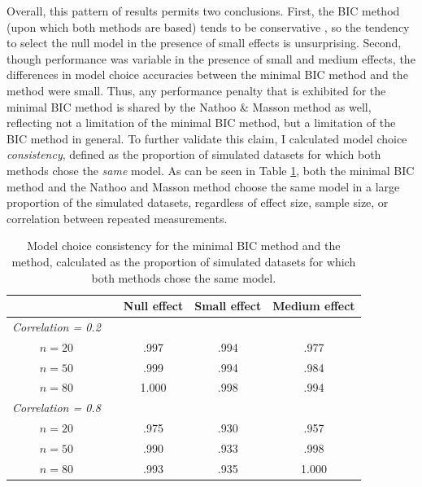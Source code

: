 \documentclass[12pt,twoside,a4paper]{article}
\begin{document}
Overall, this pattern of results permits two conclusions. First, the BIC method (upon which both methods are based) tends to be conservative \citep{wagenmakers2007}, so the tendency to select the null model in the presence of small effects is unsurprising. Second, though performance was variable in the presence of small and medium effects, the differences in model choice accuracies between the minimal BIC method and the \citet{nathoo2016} method were small. Thus, any performance penalty that is exhibited for the minimal BIC method is shared by the Nathoo \& Masson method as well, reflecting not a limitation of the minimal BIC method, but a limitation of the BIC method in general. To further validate this claim, I calculated model choice {\it consistency}, defined as the proportion of simulated datasets for which both methods chose the {\it same} model. As can be seen in Table \ref{tab:con}, both the minimal BIC method and the Nathoo and Masson method choose the same model in a large proportion of the simulated datasets, regardless of effect size, sample size, or correlation between repeated measurements.

\begin{table}
  \centering \small

  \begin{tabular}{ccccc}
    & & Null effect & Small effect & Medium effect\\
    \hline
    {\it Correlation = 0.2}\\
    $n=20$ & & .997 & .994 & .977\\
    $n=50$ & & .999 & .994 & .984\\
    $n=80$ & & 1.000 & .998 & .994\\[2mm]

    {\it Correlation = 0.8}\\
    $n=20$ & & .975 & .930 & .957\\
    $n=50$ & & .990 & .933 & .998\\
    $n=80$ & & .993 & .935 & 1.000\\
    \hline

  \end{tabular}
  \caption{Model choice consistency for the minimal BIC method and the \citet{nathoo2016} method, calculated as the proportion of simulated datasets for which both methods chose the same model.}
  \label{tab:con}
\end{table}
\end{document}
